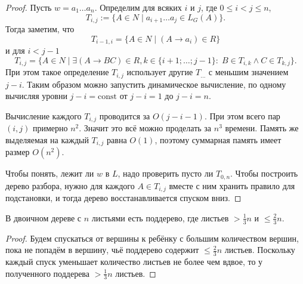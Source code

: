 \documentclass[12pt,a4paper]{article}
\newcommand{\const}{\mathrm{const}}
\begin{document}
    \begin{proof}
        Пусть $w = a_1 \dots a_n$. Определим для всяких $i$ и $j$, где $0 \leqslant i < j \leqslant n$,
        \[T_{i, j} := \{A \in N \mid a_{i+1} \dots a_j \in L_G(A)\}.\]
        Тогда заметим, что
        \[T_{i-1, i} = \{A \in N \mid (A \to a_i) \in R\}\]
        и для $i < j-1$
        \[T_{i, j} = \{A \in N \mid \exists (A \to BC) \in R, k \in \{i+1; \dots; j-1\}\colon \; B \in T_{i, k} \wedge C \in T_{k, j}\}.\]
        При этом такое определение $T_{i, j}$ использует другие $T_{\dots}$ с меньшим значением $j - i$. Таким образом можно запустить динамическое вычисление, по одному вычисляя уровни $j - i = \const$ от $j-i = 1$ до $j-i = n$.
        
        Вычисление каждого $T_{i, j}$ проводится за $O(j-i-1)$. При этом всего пар $(i, j)$ примерно $n^2$. Значит это всё можно проделать за $n^3$ времени. Память же выделяемая на каждый $T_{i, j}$ равна $O(1)$, поэтому суммарная память имеет размер $O(n^2)$.

        Чтобы понять, лежит ли $w$ в $L$, надо проверить пусто ли $T_{0, n}$. Чтобы построить дерево разбора, нужно для каждого $A \in T_{i, j}$ вместе с ним хранить правило для подстановки, и тогда дерево восстанавливается спуском вниз.
    \end{proof}

    \begin{lemma}
        В двоичном дереве с $n$ листьями есть поддерево, где листьев $> \frac{1}{3}n$ и $\leqslant \frac{2}{3}n$.
    \end{lemma}

    \begin{proof}
        Будем спускаться от вершины к ребёнку с большим количеством вершин, пока не попадём в вершину, чьё поддерево содержит $\leqslant \frac{2}{3} n$ листьев. Поскольку каждый спуск уменьшает количество листьев не более чем вдвое, то у полученного поддерева $> \frac{1}{3} n$ листьев.
    \end{proof}


\end{document}
